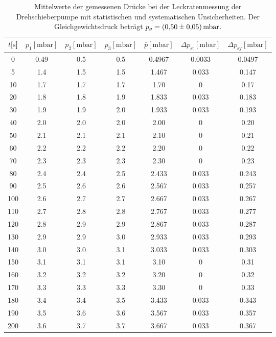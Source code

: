 \begin{table}[H]
  \centering
    \caption{Mittelwerte der gemessenen Drücke bei der Leckratenmessung der Drehschieberpumpe mit statistischen und systematischen Unsicherheiten. Der Gleichgewichtsdruck beträgt $p_g=\SI{0.50 \pm 0.05}{\milli\bar}$.}
    \label{tab:Dreh_Leck1}
    \begin{tabular}{
      S[table-format=3.0] 
      S[table-format=1.2] S[table-format=1.1] S[table-format=1.1]
      S[table-format=1.3] S[table-format=1.3] S[table-format=1.2]
      }
      \toprule
      {$t [\si{\second}$]} &
      {$p_1 [\si{\milli\bar}]$} & {$p_2 [\si{\milli\bar}]$} & {$p_3 [\si{\milli\bar}]$} &
      {$\bar{p} [\si{\milli\bar}]$} & {$\Delta p_\text{st} [\si{\milli\bar}]$} & {$\Delta p_\text{sy} [\si{\milli\bar}]$}\\
          & 0.49 & 0.5 & 0.5 & 0.4967 & 0.0033 & 0.0497\\
      5    & 1.4  & 1.5 & 1.5 & 1.467  & 0.033  & 0.147 \\
      10   & 1.7  & 1.7 & 1.7 & 1.70   & 0      & 0.17  \\
      20   & 1.8  & 1.8 & 1.9 & 1.833  & 0.033  & 0.183 \\
      30   & 1.9  & 1.9 & 2.0 & 1.933  & 0.033  & 0.193 \\
      40   & 2.0  & 2.0 & 2.0 & 2.00   & 0      & 0.20  \\
      50   & 2.1  & 2.1 & 2.1 & 2.10   & 0      & 0.21  \\
      60   & 2.2  & 2.2 & 2.2 & 2.20   & 0      & 0.22  \\
      70   & 2.3  & 2.3 & 2.3 & 2.30   & 0      & 0.23  \\
      80   & 2.4  & 2.4 & 2.5 & 2.433  & 0.033  & 0.243 \\
      90   & 2.5  & 2.6 & 2.6 & 2.567  & 0.033  & 0.257 \\
      100  & 2.6  & 2.7 & 2.7 & 2.667  & 0.033  & 0.267 \\
      110  & 2.7  & 2.8 & 2.8 & 2.767  & 0.033  & 0.277 \\
      120  & 2.8  & 2.9 & 2.9 & 2.867  & 0.033  & 0.287 \\
      130  & 2.9  & 2.9 & 3.0 & 2.933  & 0.033  & 0.293 \\
      140  & 3.0  & 3.0 & 3.1 & 3.033  & 0.033  & 0.303 \\
      150  & 3.1  & 3.1 & 3.1 & 3.10   & 0      & 0.31  \\
      160  & 3.2  & 3.2 & 3.2 & 3.20   & 0      & 0.32  \\
      170  & 3.3  & 3.3 & 3.3 & 3.30   & 0      & 0.33  \\
      180  & 3.4  & 3.4 & 3.5 & 3.433  & 0.033  & 0.343 \\
      190  & 3.5  & 3.6 & 3.6 & 3.567  & 0.033  & 0.357 \\
      200  & 3.6  & 3.7 & 3.7 & 3.667  & 0.033  & 0.367 \\
      \bottomrule
    \end{tabular}
\end{table}
